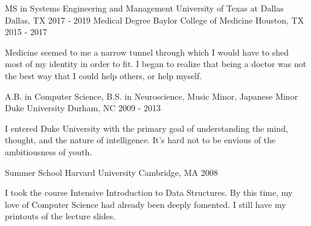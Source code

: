 \begin{cventries}
    \cventry
        {MS in Systems Engineering and Management}
        {University of Texas at Dallas}
        {Dallas, TX}
        {2017 - 2019}
        {
        }
    \cventry
        {Medical Degree}
        {Baylor College of Medicine}
        {Houston, TX}
        {2015 - 2017}
        {
            \begin{cvparagraph}
                Medicine seemed to me a narrow tunnel through which I would have to shed most of my identity in order to fit. I began to realize that being a doctor was not the best way that I could help others, or help myself.
            \end{cvparagraph}
        }
    \cventry
        {A.B. in Computer Science, B.S. in Neuroscience, Music Minor, Japanese Minor}
        {Duke University}
        {Durham, NC}
        {2009 - 2013}
        {
            \begin{cvparagraph}
                I entered Duke University with the primary goal of understanding the mind, thought, and the nature of intelligence. It's hard not to be envious of the ambitiousness of youth.
            \end{cvparagraph}
        }
    \cventry
        {Summer School}
        {Harvard University}
        {Cambridge, MA}
        {2008}
        {
            \begin{cvparagraph}
                I took the course Intensive Introduction to Data Structures. By this time, my love of Computer Science had already been deeply fomented. I still have my printouts of the lecture slides.
            \end{cvparagraph}
        }
\end{cventries}
